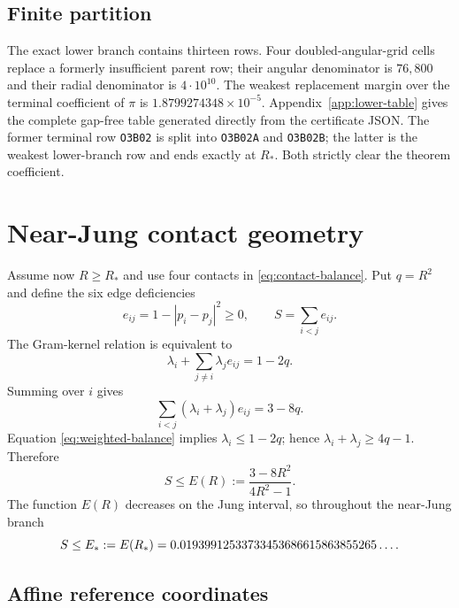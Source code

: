 \documentclass[11pt,reqno]{amsart}
\theoremstyle{remark}
\begin{document}
\subsection{Finite partition}

The exact lower branch contains thirteen rows.  Four doubled-angular-grid cells
replace a formerly insufficient parent row; their angular denominator is
$76{,}800$ and their radial denominator is $4\cdot10^{10}$.  The weakest
replacement margin over the terminal coefficient of $\pi$ is
$1.8799274348\times10^{-5}$.  Appendix~\ref{app:lower-table} gives the complete
gap-free table generated directly from the certificate JSON.  The former terminal row \texttt{O3B02} is split into \texttt{O3B02A} and
\texttt{O3B02B}; the latter is the weakest lower-branch row and ends exactly
at $R_*$.  Both strictly clear the theorem coefficient.

\section{Near-Jung contact geometry}
\label{sec:contact}

Assume now $R\ge R_*$ and use four contacts in
\eqref{eq:contact-balance}.  Put $q=R^2$ and define the six edge deficiencies
\begin{equation}\label{eq:deficiency}
 e_{ij}=1-|p_i-p_j|^2\ge0,
 \qquad S=\sum_{i<j}e_{ij}.
\end{equation}
The Gram-kernel relation is equivalent to
\begin{equation}\label{eq:weighted-balance}
 \lambda_i+\sum_{j\ne i}\lambda_j e_{ij}=1-2q.
\end{equation}
Summing over $i$ gives
\begin{equation}\label{eq:weighted-sum}
 \sum_{i<j}(\lambda_i+\lambda_j)e_{ij}=3-8q.
\end{equation}
Equation \eqref{eq:weighted-balance} implies $\lambda_i\le1-2q$; hence
$\lambda_i+\lambda_j\ge4q-1$.  Therefore
\begin{equation}\label{eq:scalar-budget}
 \boxed{S\le E(R):=\frac{3-8R^2}{4R^2-1}.}
\end{equation}
The function $E(R)$ decreases on the Jung interval, so throughout the
near-Jung branch
\[
 S\le E_*:=E(R_*)=0.01939912533733453686615863855265\ldots.
\]

\subsection{Affine reference coordinates}
\end{document}
